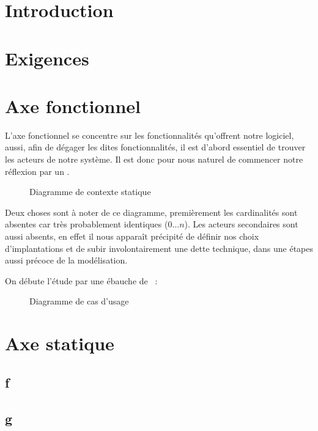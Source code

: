 \documentclass[a4paper,french,final]{memoir}
\begin{document}
\begin{titlingpage}
\hypersetup{pageanchor=false}

\end{titlingpage}
\frontmatter
\tableofcontents
\chapter{Introduction}
\mainmatter
\chapter{Exigences}\label{chap:Exigence}
\chapter{Axe fonctionnel}

L'axe fonctionnel se concentre sur les fonctionnalités qu'offrent notre logiciel, aussi, afin de dégager les dites fonctionnalités, il est d'abord essentiel de trouver les acteurs de notre système. Il est donc pour nous naturel de commencer notre réflexion par un .

\begin{figure}[!h]
    \centering

\caption{Diagramme de contexte statique}
    \label{fig:diagstat}
\end{figure}
Deux choses sont à noter de ce diagramme, premièrement les cardinalités sont absentes car très probablement identiques ($0\dots n$).
Les acteurs secondaires sont aussi absents, en effet il nous apparaît précipité de définir nos choix d'implantations et de subir involontairement une dette technique, dans une étapes aussi précoce de la modélisation.

On débute l'étude par une ébauche de~ : 
\begin{figure}[!ht]
    \centering

\caption{Diagramme de cas d'usage}
    \label{fig:diaguc}
\end{figure}
\chapter{Axe statique}\label{chapStatique}
\section{f}
\section{g}
\end{document}
